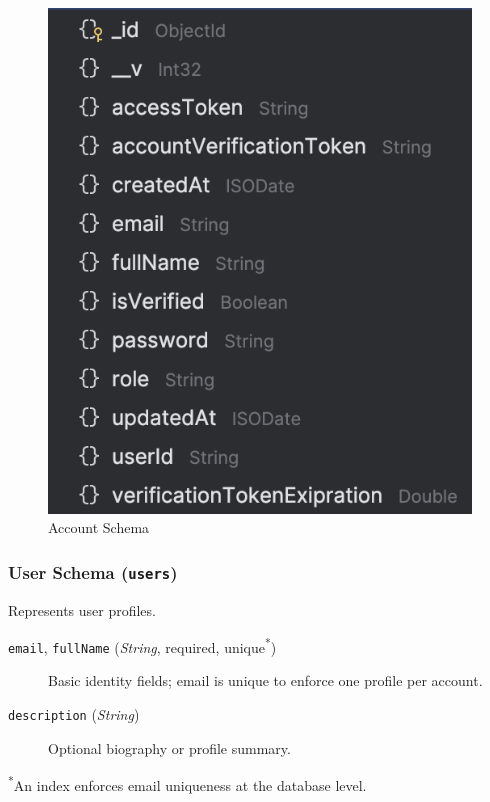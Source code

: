 \begin{figure}[H]
  \centering
  \includegraphics{account-schema.png}
  \caption*{Account Schema}
  \label{fig:acc-shcema}
\end{figure}

\subsubsection{User Schema (\texttt{users})}
Represents user profiles.
\begin{description}
  \item[\texttt{email}, \texttt{fullName} (\emph{String}, required, unique\textsuperscript{*})]  
    Basic identity fields; email is unique to enforce one profile per account.
  \item[\texttt{description} (\emph{String})]  
    Optional biography or profile summary.
\end{description}
\textsuperscript{*}An index enforces email uniqueness at the database level.

